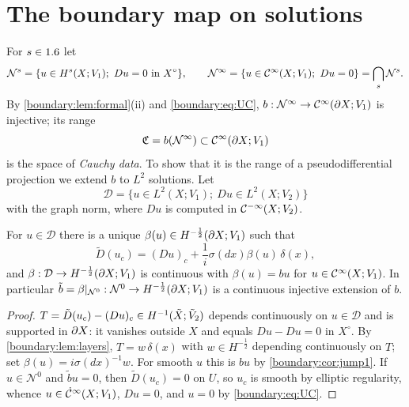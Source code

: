 \section{The boundary map on solutions}\label{boundary:sec:boundary-map}

For $s\in1.6$ let
\begin{equation*}
\mathcal{N}^s=\{u\in H^s(X;V_1);\ Du=0\ \text{in}\ X^\circ\},\qquad
\mathcal{N}^\infty=\{u\in\CI(X;V_1);\ Du=0\}=\bigcap_s\mathcal{N}^s.
\end{equation*}
By \cref{boundary:lem:formal}(ii) and \eqref{boundary:eq:UC}, $b:\mathcal{N}^\infty\to
\mathcal{C}^\infty(\partial X;V_1)$ is injective; its range
\begin{equation*}
\mathfrak{C}=b(\mathcal{N}^\infty)\subset\mathcal{C}^\infty(\partial X;V_1)
\end{equation*}
is the space of \emph{Cauchy data}. To show that it is the range of a
pseudodifferential projection we extend $b$ to $L^2$ solutions. Let
\begin{equation*}
\mathcal{D}=\{u\in L^2(X;V_1);\ Du\in L^2(X;V_2)\}
\end{equation*}
with the graph norm, where $Du$ is computed in $\mathcal{C}^{-\infty}(X;V_2)$.

\begin{lemma}\label{boundary:lem:beta}
For $u\in\mathcal{D}$ there is a unique $\beta(u)\in H^{-\frac12}(\partial X;V_1)$ such that
\begin{equation}\label{boundary:eq:beta}
\tilde D(u_c)=(Du)_c+\frac1i\sigma(dx)\beta(u)\,\delta(x),
\end{equation}
and $\beta:\mathcal{D}\to H^{-\frac12}(\partial X;V_1)$ is continuous with $\beta(u)=bu$ for
$u\in\mathcal{C}^\infty(X;V_1)$. In particular $\tilde b=\beta|_{\mathcal{N}^0}:\mathcal{N}^0\to
H^{-\frac12}(\partial X;V_1)$ is a continuous injective extension of $b$.
\end{lemma}
\begin{proof}
$T=\tilde D(u_c)-(Du)_c\in H^{-1}(\tilde{X};\tilde V_2)$ depends continuously on $u\in
\mathcal{D}$ and is supported in $\partial X$: it vanishes outside $X$ and equals $Du-Du=0$
in $X^\circ$. By \cref{boundary:lem:layers}, $T=w\,\delta(x)$ with $w\in
H^{-\frac12}$ depending continuously on $T$; set $\beta(u)=i\sigma(dx)^{-1}w$. For
smooth $u$ this is $bu$ by \cref{boundary:cor:jump1}. If $u\in\mathcal{N}^0$ and
$\tilde b u=0$, then $\tilde D(u_c)=0$ on $U$, so $u_c$ is smooth by elliptic
regularity, whence $u\in\dot{\mathcal{C}}^\infty(X;V_1)$, $Du=0$, and $u=0$ by \eqref{boundary:eq:UC}.
\end{proof}

